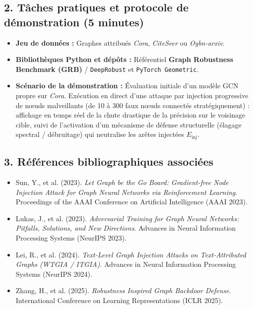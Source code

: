 \documentclass[11pt, a4paper]{article}
\begin{document}
\subsection*{2. Tâches pratiques et protocole de démonstration (5 minutes)}
\begin{itemize}
    \item \textbf{Jeu de données :} Graphes attribués \textit{Cora}, \textit{CiteSeer} ou \textit{Ogbn-arxiv}.
    \item \textbf{Bibliothèques Python et dépôts :} Référentiel \textbf{Graph Robustness Benchmark (GRB)} / \texttt{DeepRobust} et \texttt{PyTorch Geometric}.
    \item \textbf{Scénario de la démonstration :} Évaluation initiale d'un modèle GCN propre sur \textit{Cora}. Exécution en direct d'une attaque par injection progressive de nœuds malveillants (de 10 à 300 faux nœuds connectés stratégiquement) : affichage en temps réel de la chute drastique de la précision sur le voisinage cible, suivi de l'activation d'un mécanisme de défense structurelle (élagage spectral / débruitage) qui neutralise les arêtes injectées $E_{\text{inj}}$.
\end{itemize}

\subsection*{3. Références bibliographiques associées}
\begin{itemize}
    \item Sun, Y., et al. (2023). \textit{Let Graph be the Go Board: Gradient-free Node Injection Attack for Graph Neural Networks via Reinforcement Learning}. Proceedings of the AAAI Conference on Artificial Intelligence (AAAI 2023).
    \item Lukas, J., et al. (2023). \textit{Adversarial Training for Graph Neural Networks: Pitfalls, Solutions, and New Directions}. Advances in Neural Information Processing Systems (NeurIPS 2023).
    \item Lei, R., et al. (2024). \textit{Text-Level Graph Injection Attacks on Text-Attributed Graphs (WTGIA / ITGIA)}. Advances in Neural Information Processing Systems (NeurIPS 2024).
    \item Zhang, H., et al. (2025). \textit{Robustness Inspired Graph Backdoor Defense}. International Conference on Learning Representations (ICLR 2025).
\end{itemize}

\newpage
\end{document}
